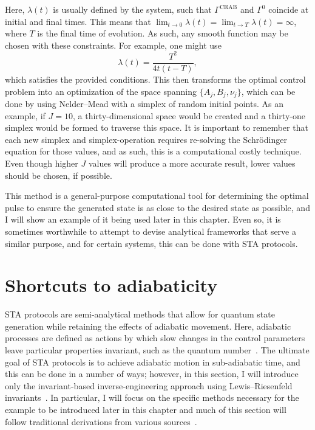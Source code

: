 \noindent Here, $\lambda(t)$ is usually defined by the system, such that $\Gamma^{\text{CRAB}}$ and $\Gamma^0$ coincide at initial and final times.
This means that $\lim_{t\rightarrow 0} \lambda(t) = \lim_{t\rightarrow T}\lambda(t) = \infty$, where $T$ is the final time of evolution.
As such, any smooth function may be chosen with these constraints.
For example, one might use
\begin{equation}
\lambda(t) = \frac{T^2}{4t(t-T)},
\end{equation}
\noindent which satisfies the provided conditions.
This then transforms the optimal control problem into an optimization of the space spanning $\{A_j, B_j, \nu_j\}$, which can be done by using Nelder--Mead with a simplex of random initial points.
As an example, if $J = 10$, a thirty-dimensional space would be created and a thirty-one simplex would be formed to traverse this space.
It is important to remember that each new simplex and simplex-operation requires re-solving the Schr\"odinger equation for those values, and as such, this is a computational costly technique.
Even though higher $J$ values will produce a more accurate result, lower values should be chosen, if possible.

This method is a general-purpose computational tool for determining the optimal pulse to ensure the generated state is as close to the desired state as possible, and I will show an example of it being used later in this chapter.
Even so, it is sometimes worthwhile to attempt to devise analytical frameworks that serve a similar purpose, and for certain systems, this can be done with STA protocols.

\section{Shortcuts to adiabaticity}

STA protocols are semi-analytical methods that allow for quantum state generation while retaining the effects of adiabatic movement.
Here, adiabatic processes are defined as actions by which slow changes in the control parameters leave particular properties invariant, such as the quantum number~\cite{guery2019}.
The ultimate goal of STA protocols is to achieve adiabatic motion in sub-adiabatic time, and this can be done in a number of ways; however, in this section, I will introduce only the invariant-based inverse-engineering approach using Lewis--Riesenfeld invariants~\cite{torrontegui2013}.
In particular, I will focus on the specific methods necessary for the example to be introduced later in this chapter and much of this section will follow traditional derivations from various sources~\cite{torrontegui2013,guery2019, schloss2016}.

